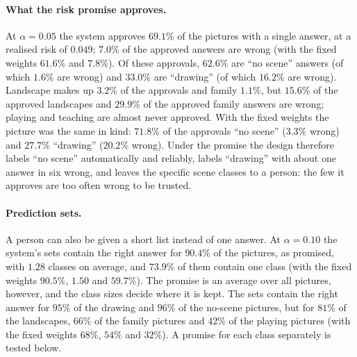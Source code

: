 \paragraph{What the risk promise approves.} At $\alpha=0.05$ the system approves $69.1\%$ of the pictures with a single answer, at a realised risk of $0.049$; $7.0\%$ of the approved answers are wrong (with the fixed weights $61.6\%$ and $7.8\%$). Of these approvals, $62.6\%$ are ``no scene'' answers (of which $1.6\%$ are wrong) and $33.0\%$ are ``drawing'' (of which $16.2\%$ are wrong). Landscape makes up $3.2\%$ of the approvals and family $1.1\%$, but $15.6\%$ of the approved landscapes and $29.9\%$ of the approved family answers are wrong; playing and teaching are almost never approved. With the fixed weights the picture was the same in kind: $71.8\%$ of the approvals ``no scene'' ($3.3\%$ wrong) and $27.7\%$ ``drawing'' ($20.2\%$ wrong). Under the promise the design therefore labels ``no scene'' automatically and reliably, labels ``drawing'' with about one answer in six wrong, and leaves the specific scene classes to a person: the few it approves are too often wrong to be trusted.

\paragraph{Prediction sets.} A person can also be given a short list instead of one answer. At $\alpha=0.10$ the system's sets contain the right answer for $90.4\%$ of the pictures, as promised, with $1.28$ classes on average, and $73.9\%$ of them contain one class (with the fixed weights $90.5\%$, $1.50$ and $59.7\%$). The promise is an average over all pictures, however, and the class sizes decide where it is kept. The sets contain the right answer for $95\%$ of the drawing and $96\%$ of the no-scene pictures, but for $81\%$ of the landscapes, $66\%$ of the family pictures and $42\%$ of the playing pictures (with the fixed weights $68\%$, $54\%$ and $32\%$). A promise for each class separately is tested below.

